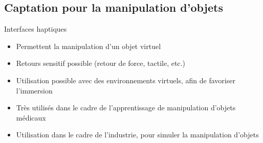     \subsection{Captation pour la manipulation d'objets}
    \begin{frame}{\subsecname}
        \begin{block}{Interfaces haptiques}
            \begin{itemize}[label=$\bullet$]
                \item Permettent la manipulation d'un objet virtuel
                \item Retours sensitif possible (retour de force, tactile, etc.)
                \item Utilisation possible avec des environnements virtuels, afin de favoriser l'immersion 
                \item Très utilisés dans le cadre de l'apprentissage de manipulation d'objets médicaux 
                \item Utilisation dans le cadre de l'industrie, pour simuler la manipulation d'objets 
            \end{itemize}
        \end{block}
    \end{frame}
    
